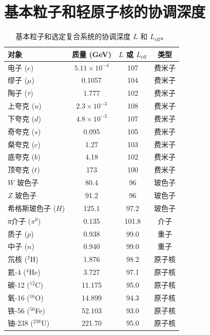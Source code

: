 \documentclass[11pt,a4paper]{article}
\begin{document}
	\section*{基本粒子和轻原子核的协调深度}
	\begin{table}[H]
		\centering
		\caption{基本粒子和选定复合系统的协调深度 \(L\) 和 \(L_{\mathrm{eff}}\)。}
		\label{tab:depths_particles}
		\small
		\begin{tabular}{l c c c}
			\toprule
			\textbf{对象} & \textbf{质量 (GeV)} & \textbf{\(L\) 或 \(L_{\mathrm{eff}}\)} & \textbf{类型} \\
			\midrule
			电子 (\(e\)) & \(5.11\times10^{-4}\) & 107 & 费米子 \\
			缪子 (\(\mu\)) & 0.1057 & 104 & 费米子 \\
			陶子 (\(\tau\)) & 1.777 & 102 & 费米子 \\
			上夸克 (\(u\)) & \(2.3\times10^{-3}\) & 108 & 费米子 \\
			下夸克 (\(d\)) & \(4.8\times10^{-3}\) & 107 & 费米子 \\
			奇夸克 (\(s\)) & 0.095 & 105 & 费米子 \\
			粲夸克 (\(c\)) & 1.27 & 103 & 费米子 \\
			底夸克 (\(b\)) & 4.18 & 102 & 费米子 \\
			顶夸克 (\(t\)) & 173 & 100 & 费米子 \\
			\(W\) 玻色子 & 80.4 & 96 & 玻色子 \\
			\(Z\) 玻色子 & 91.2 & 96 & 玻色子 \\
			希格斯玻色子 (\(H\)) & 125.1 & 97.2 & 玻色子 \\
			π介子 (\(\pi^0\)) & 0.135 & 101.8 & 介子 \\
			质子 (\(p\)) & 0.938 & 99.0 & 重子 \\
			中子 (\(n\)) & 0.940 & 99.0 & 重子 \\
			氘核 (\(^2\)H) & 1.876 & 98.2 & 原子核 \\
			氦-4 (\(^4\)He) & 3.727 & 97.1 & 原子核 \\
			碳-12 (\(^{12}\)C) & 11.175 & 95.0 & 原子核 \\
			氧-16 (\(^{16}\)O) & 14.899 & 94.3 & 原子核 \\
			铁-56 (\(^{56}\)Fe) & 52.103 & 93.0 & 原子核 \\
			铀-238 (\(^{238}\)U) & 221.70 & 95.0 & 原子核 \\
			\bottomrule
		\end{tabular}
	\end{table}
	
\end{document}
